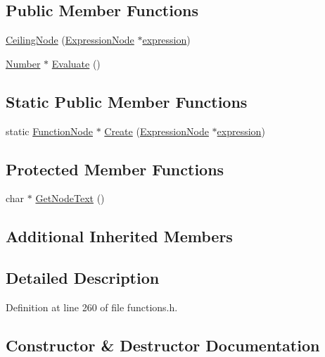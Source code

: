 \subsection*{Public Member Functions}
\begin{DoxyCompactItemize}
\item 
\hyperlink{classCeilingNode_ab3c7e409e41fe1f5c6561e907ff4a5bf}{Ceiling\+Node} (\hyperlink{classExpressionNode}{Expression\+Node} $\ast$\hyperlink{classFunctionNode_ad7577b179a1937aaf8a0058bb5b546dc}{expression})
\item 
\hyperlink{structNumber}{Number} $\ast$ \hyperlink{classCeilingNode_ac5a24bd7b0ef5d280dc9da0723983541}{Evaluate} ()
\end{DoxyCompactItemize}
\subsection*{Static Public Member Functions}
\begin{DoxyCompactItemize}
\item 
static \hyperlink{classFunctionNode}{Function\+Node} $\ast$ \hyperlink{classCeilingNode_a6b935b420b30e2ce311a7fe179585baf}{Create} (\hyperlink{classExpressionNode}{Expression\+Node} $\ast$\hyperlink{classFunctionNode_ad7577b179a1937aaf8a0058bb5b546dc}{expression})
\end{DoxyCompactItemize}
\subsection*{Protected Member Functions}
\begin{DoxyCompactItemize}
\item 
char $\ast$ \hyperlink{classCeilingNode_a42887bd7fd45fdd658a60e6cc1114129}{Get\+Node\+Text} ()
\end{DoxyCompactItemize}
\subsection*{Additional Inherited Members}


\subsection{Detailed Description}


Definition at line 260 of file functions.\+h.



\subsection{Constructor \& Destructor Documentation}
